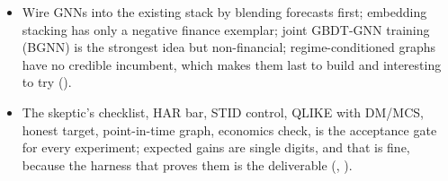 \begin{itemize}[nosep]
  \item Wire GNNs into the existing stack by blending forecasts first; embedding stacking has only a negative finance exemplar; joint GBDT-GNN training (BGNN) is the strongest idea but non-financial; regime-conditioned graphs have no credible incumbent, which makes them last to build and interesting to try ().
  \item The skeptic's checklist, HAR bar, STID control, QLIKE with DM/MCS, honest target, point-in-time graph, economics check, is the acceptance gate for every experiment; expected gains are single digits, and that is fine, because the harness that proves them is the deliverable (, ).
\end{itemize}
